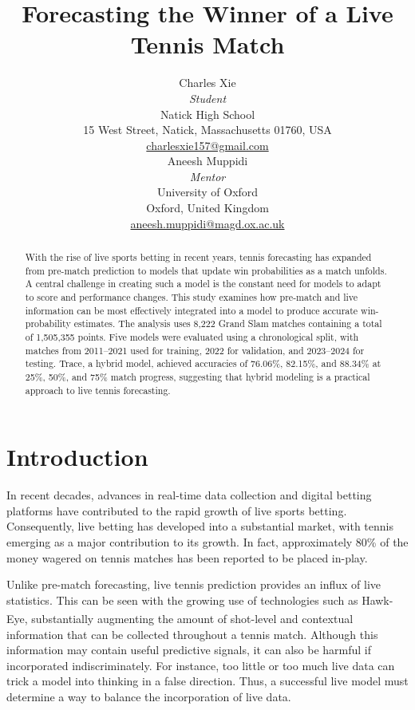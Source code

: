 \documentclass[10pt,twocolumn]{article}
\title{\bfseries Forecasting the Winner of a Live Tennis Match}
\author{%
\begin{minipage}[t]{0.44\textwidth}
\centering
Charles Xie\\[-1pt]
\small\textit{Student}\\[2pt]
\small Natick High School\\
\small 15 West Street, Natick, Massachusetts 01760, USA\\
\small \href{mailto:charlesxie157@gmail.com}{charlesxie157@gmail.com}
\end{minipage}
\hfill
\begin{minipage}[t]{0.44\textwidth}
\centering
Aneesh Muppidi\\[-1pt]
\small\textit{Mentor}\\[2pt]
\small University of Oxford\\
\small Oxford, United Kingdom\\
\small \href{mailto:aneesh.muppidi@magd.ox.ac.uk}{aneesh.muppidi@magd.ox.ac.uk}
\end{minipage}}
\date{}
\begin{document}
\maketitle

\begin{abstract}
With the rise of live sports betting in recent years, tennis forecasting has expanded from pre-match prediction to models that update win probabilities as a match unfolds. A central challenge in creating such a model is the constant need for models to adapt to score and performance changes. This study examines how pre-match and live information can be most effectively integrated into a model to produce accurate win-probability estimates. The analysis uses 8,222 Grand Slam matches containing a total of 1,505,355 points. Five models were evaluated using a chronological split, with matches from 2011--2021 used for training, 2022 for validation, and 2023--2024 for testing. Trace, a hybrid model, achieved accuracies of 76.06\%, 82.15\%, and 88.34\% at 25\%, 50\%, and 75\% match progress, suggesting that hybrid modeling is a practical approach to live tennis forecasting.
\end{abstract}


\section{Introduction}

In recent decades, advances in real-time data collection and digital betting platforms have contributed to the rapid growth of live sports betting.\cite{ding2025} Consequently, live betting has developed into a substantial market, with tennis emerging as a major contribution to its growth. In fact, approximately 80\% of the money wagered on tennis matches has been reported to be placed in-play.\cite{sipko2015}

Unlike pre-match forecasting, live tennis prediction provides an influx of live statistics. This can be seen with the growing use of technologies such as Hawk-Eye\textsuperscript{\textregistered}, substantially augmenting the amount of shot-level and contextual information that can be collected throughout a tennis match.\cite{fitzpatrick2024} Although this information may contain useful predictive signals, it can also be harmful if incorporated indiscriminately. For instance, too little or too much live data can trick a model into thinking in a false direction.\cite{gollub2021} Thus, a successful live model must determine a way to balance the incorporation of live data.\cite{ciobanu2023}
\end{document}
